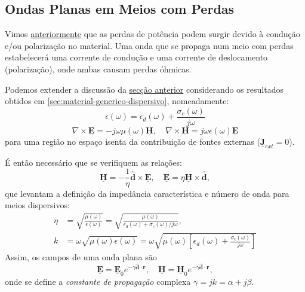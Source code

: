 \subsection{Ondas Planas em Meios com Perdas} \label{sec:ondas-com-perdas}

Vimos \hyperref[sec:material-generico-dispersivo]{anteriormente} que as perdas de potência podem surgir devido à condução e/ou polarização no material. Uma onda que se propaga num meio com perdas estabelecerá uma corrente de condução e uma corrente de deslocamento (polarização), onde ambas causam perdas óhmicas.

Podemos extender a discussão da \hyperref[sec:ondas-sem-perdas]{secção anterior} considerando os resultados obtidos em \ref{sec:material-generico-dispersivo}, nomeadamente:
\begin{equation}
    \epsilon(\omega) = \epsilon_d(\omega) + \frac{\sigma_c(\omega)}{j\omega}
\end{equation}
\begin{equation}
    \nabla \times \mathbf{\underline{E}} = -j\omega\mu(\omega)\mathbf{\underline{H}},
    \quad
    \nabla \times \mathbf{\underline{H}} = j\omega\epsilon(\omega)\mathbf{\underline{E}}
\end{equation}
para uma região no espaço isenta da contribuição de fontes externas ($\mathbf{\underline{J}}_{ext} = 0$). 

É então necessário que se verifiquem as relações:
\begin{equation}
    \mathbf{\underline{H}} = -\frac{1}{\eta}\mathbf{\hat{d}} \times \mathbf{\underline{E}}, \quad \mathbf{\underline{E}} = \eta\mathbf{\underline{H}} \times \mathbf{\hat{d}},
\end{equation}
que levantam a definição da impedância característica e número de onda para meios dispersivos:
\begin{align}
    \eta &= \sqrt{\frac{\mu(\omega)}{\epsilon(\omega)}} = \sqrt{\frac{\mu(\omega)}{\epsilon_d(\omega) + \sigma_c(\omega)/j\omega}}, \\
    k &= \omega \sqrt{\mu(\omega)\epsilon(\omega)} = \omega \sqrt{\mu(\omega)\left[\epsilon_d(\omega) + \frac{\sigma_c(\omega)}{j\omega}\right]}
\end{align}
Assim, os campos de uma onda plana são
\begin{equation} \label{eq:campos-onda-lossy-media}
    \mathbf{\underline{E}} = \mathbf{\underline{E}}_0 e^{-\gamma \mathbf{\hat{d}} \cdot \mathbf{r}},
    \quad
    \mathbf{\underline{H}} = \mathbf{\underline{H}}_0 e^{-\gamma \mathbf{\hat{d}} \cdot \mathbf{r}},
\end{equation}
onde se define a \textit{constante de propagação} complexa $\gamma = jk = \alpha + j\beta$.


